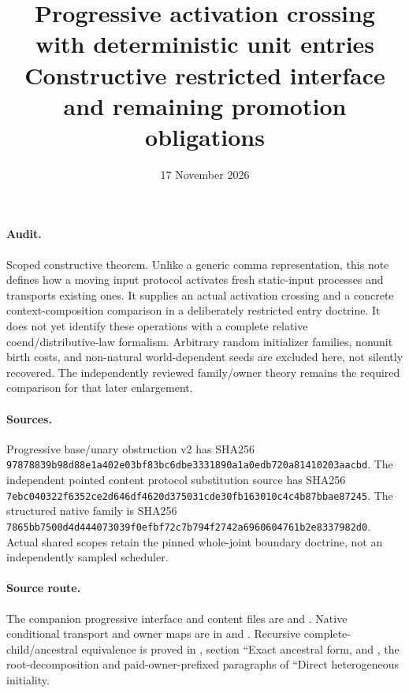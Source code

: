 \documentclass[11pt]{article}\usepackage{amsmath,amssymb,amsthm,geometry}\geometry{margin=1in}
\title{Progressive activation crossing with deterministic unit entries\\Constructive restricted interface and remaining promotion obligations}
\date{17 November 2026}
\begin{document}
\maketitle
\paragraph{Audit.} Scoped constructive theorem. Unlike a generic comma representation, this note defines how a moving input protocol activates fresh static-input processes and transports existing ones. It supplies an actual activation crossing and a concrete context-composition comparison in a deliberately restricted entry doctrine. It does not yet identify these operations with a complete relative coend/distributive-law formalism. Arbitrary random initializer families, nonunit birth costs, and non-natural world-dependent seeds are excluded here, not silently recovered. The independently reviewed family/owner theory remains the required comparison for that later enlargement.

\paragraph{Sources.} Progressive base/unary obstruction v2 has SHA256 \texttt{97878839b98d88e1a402e03bf83bc6dbe3331890a1a0edb720a81410203aacbd}. The independent pointed content protocol substitution source has SHA256 \texttt{7ebc040322f6352ce2d646df4620d375031cde30fb163010c4c4b87bbae87245}. The structured native family is SHA256 \texttt{7865bb7500d4d444073039f0efbf72c7b794f2742a6960604761b2e8337982d0}. Actual shared scopes retain the pinned whole-joint boundary doctrine, not an independently sampled scheduler.

\paragraph{Source route.} The companion progressive interface and content files are \texttt{} and \texttt{}. Native conditional transport and owner maps are in \texttt{} and \texttt{}. Recursive complete-child/ancestral equivalence is proved in \texttt{}, section ``Exact ancestral form, and \texttt{}, the root-decomposition and paid-owner-prefixed paragraphs of ``Direct heterogeneous initiality.
\end{document}
